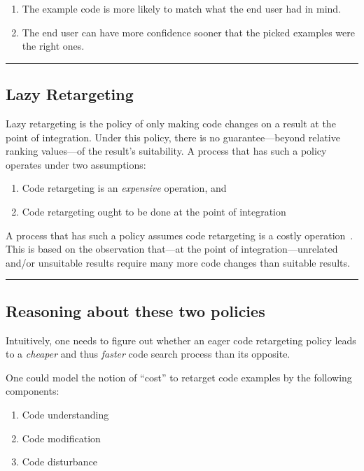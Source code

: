 \begin{enumerate}
	\item The example code is more likely to match what the end user had in mind.
	\item The end user can have more confidence sooner that the picked examples were the right ones.
\end{enumerate}


\fancybreak{\pfbreakdisplay}

\subsection{Lazy Retargeting}

Lazy retargeting is the policy of only making code changes on a result at the point of integration. Under this policy, there is no guarantee---beyond relative ranking values---of the result's suitability. A process that has such a policy operates under two assumptions:

\begin{enumerate}
	\item Code retargeting is an \emph{expensive} operation, and
	\item Code retargeting ought to be done at the point of integration
\end{enumerate}

A process that has such a policy assumes code retargeting is a costly operation~\cite{Brandt:2009ew, Wightman:2012gc}. This is based on the observation that---at the point of integration---unrelated and/or unsuitable results require many more code changes than suitable results.

\fancybreak{\pfbreakdisplay}

\subsection{Reasoning about these two policies}

Intuitively, one needs to figure out whether an eager code retargeting policy leads to a \emph{cheaper} and thus \emph{faster} code search process than its opposite. 

One could model the notion of ``cost'' to retarget code examples by the following components:

\begin{enumerate}
	\item Code understanding
	\item Code modification
	\item Code disturbance
\end{enumerate}
 
